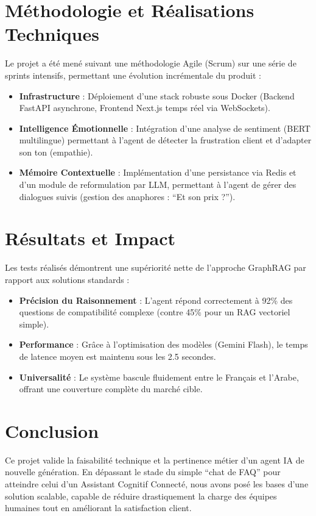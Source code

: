 \section{Méthodologie et Réalisations Techniques}
Le projet a été mené suivant une méthodologie Agile (Scrum) sur une série de sprints intensifs, permettant une évolution incrémentale du produit :

\begin{itemize}
    \item \textbf{Infrastructure} : Déploiement d'une stack robuste sous Docker (Backend FastAPI asynchrone, Frontend Next.js temps réel via WebSockets).
    \item \textbf{Intelligence Émotionnelle} : Intégration d'une analyse de sentiment (BERT multilingue) permettant à l'agent de détecter la frustration client et d'adapter son ton (empathie).
    \item \textbf{Mémoire Contextuelle} : Implémentation d'une persistance via Redis et d'un module de reformulation par LLM, permettant à l'agent de gérer des dialogues suivis (gestion des anaphores : ``Et son prix ?'').
\end{itemize}

\section{Résultats et Impact}
Les tests réalisés démontrent une supériorité nette de l'approche GraphRAG par rapport aux solutions standards :
\begin{itemize}
    \item \textbf{Précision du Raisonnement} : L'agent répond correctement à 92\% des questions de compatibilité complexe (contre 45\% pour un RAG vectoriel simple).
    \item \textbf{Performance} : Grâce à l'optimisation des modèles (Gemini Flash), le temps de latence moyen est maintenu sous les 2.5 secondes.
    \item \textbf{Universalité} : Le système bascule fluidement entre le Français et l'Arabe, offrant une couverture complète du marché cible.
\end{itemize}

\section{Conclusion}
Ce projet valide la faisabilité technique et la pertinence métier d'un agent IA de nouvelle génération. En dépassant le stade du simple ``chat de FAQ'' pour atteindre celui d'un Assistant Cognitif Connecté, nous avons posé les bases d'une solution scalable, capable de réduire drastiquement la charge des équipes humaines tout en améliorant la satisfaction client.

\vspace{0.5cm}
\noindent {}

\printKeywords